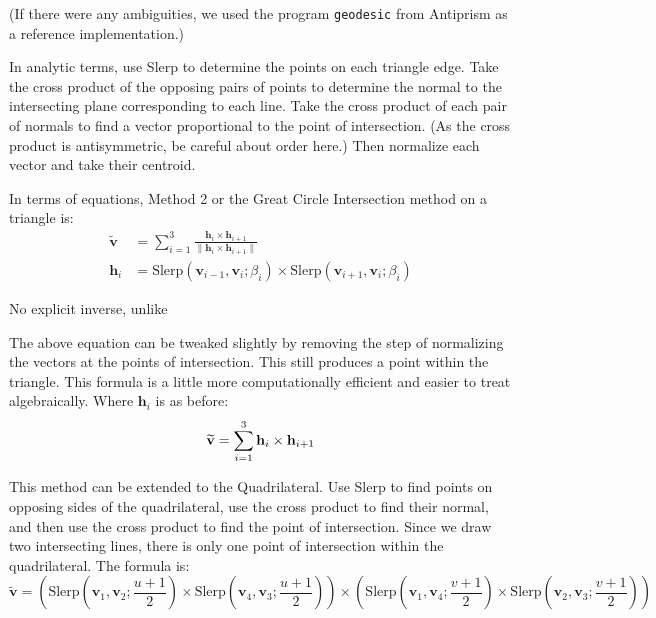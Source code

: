 \documentclass{amsart}[12pt]
\begin{document}
(If there were any ambiguities, we used the program \texttt{geodesic}
from Antiprism\cite{antiprism} as a reference implementation.)

In analytic terms, use Slerp to determine the points on each triangle edge.
Take the cross product of the opposing pairs of points to determine the normal
to the intersecting plane corresponding to each line. Take the cross product of
each pair of normals to find a vector proportional to the point of
intersection. (As the cross product is antisymmetric, be careful about order
here.) Then normalize each vector and take their centroid.

In terms of equations, Method 2 or the Great Circle Intersection
method on a triangle is:
\begin{equation}\begin{split}%
\widetilde{\mathbf v} & = \sum^3_{i=1} \frac{\mathbf h_i \times \mathbf h_{i+1}}
{\|\mathbf h_i \times \mathbf h_{i+1}\|} \\
\mathbf h_i & =
\mathrm{Slerp}(\mathbf v_{i-1}, \mathbf v_i; \beta_{i})
\times
\mathrm{Slerp}(\mathbf v_{i+1}, \mathbf v_i; \beta_{i})
\end{split}\end{equation}

No explicit inverse, unlike \cite{gray95}\cite{crider08}

The above equation can be tweaked slightly by removing the step of normalizing
the vectors at the points of intersection. This still produces a point within
the triangle. This formula is a little more computationally efficient and
easier to treat algebraically. Where $\mathbf h_i$ is as before:
\begin{equation}\label{eq:gct}%
\widetilde{\mathbf v} = \sum^3_{i=1} \mathbf h_i \times \mathbf h_{i+1} \\
\end{equation}

This method can be extended to the Quadrilateral. Use Slerp to find points on
opposing sides of the quadrilateral, use the cross product to find their
normal, and then use the cross product to find the point of intersection. Since
we draw two intersecting lines, there is only one point of intersection within
the quadrilateral. The formula is:
\begin{equation}\label{eq:gcq}%
\widetilde{\mathbf v} =
(\mathrm{Slerp}(\mathbf v_1, \mathbf v_2; \frac{u+1}{2})
\times
\mathrm{Slerp}(\mathbf v_4, \mathbf v_3; \frac{u+1}{2}))
\times
(\mathrm{Slerp}(\mathbf v_1, \mathbf v_4; \frac{v+1}{2})
\times
\mathrm{Slerp}(\mathbf v_2, \mathbf v_3; \frac{v+1}{2}))
\end{equation}
\end{document}
